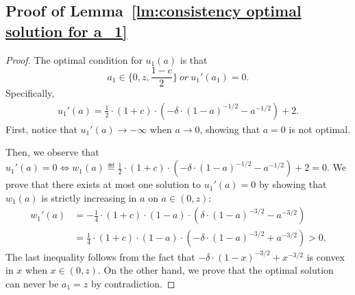 \subsection{Proof of Lemma~\ref{lm:consistency optimal solution for a_1}}
\begin{proof}
The optimal condition for $u_1(a)$ is that $$a_1\in\{0,z,
\frac{1-c}{2}\}\ or~ u_1'(a_1)=0.$$ Specifically,
\begin{align*}
   u_1'(a)=\frac{1}{2}\cdot(1+c)\cdot\left(-\delta\cdot(1-a)^{-1/2}-a^{-1/2}\right)+2.
\end{align*}
First, notice that $u_1'(a)\rightarrow -\infty$ when $a\rightarrow 0$, showing that $a=0$ is not optimal.

Then, we observe that $u_1'(a)=0\Leftrightarrow w_1(a)\eqdef\frac{1}{2}\cdot(1+c)\cdot\left(-\delta\cdot(1-a)^{-1/2}-a^{-1/2}\right)+2=0$. We prove that there exists at most one solution to $u_1'(a)=0$ by showing that $w_1(a)$ is strictly increasing in $a$ on $a\in(0,z)$:
\begin{align*}
  w_1'(a)&=-\frac{1}{4}\cdot(1+c)\cdot(1-a)\cdot\left(\delta\cdot(1-a)^{-3/2}-a^{-3/2}\right) \\
  &= \frac{1}{4}\cdot(1+c)\cdot(1-a)\cdot\left(-\delta\cdot(1-a)^{-3/2}+a^{-3/2}\right)> 0.
\end{align*}
The last inequality follows from the fact that $-\delta\cdot(1-x)^{-3/2}+x^{-3/2}$ is convex in $x$ when $x\in(0,z)$.
On the other hand, we prove that the optimal solution can never be $a_1=z$ by contradiction. 


\end{proof}
